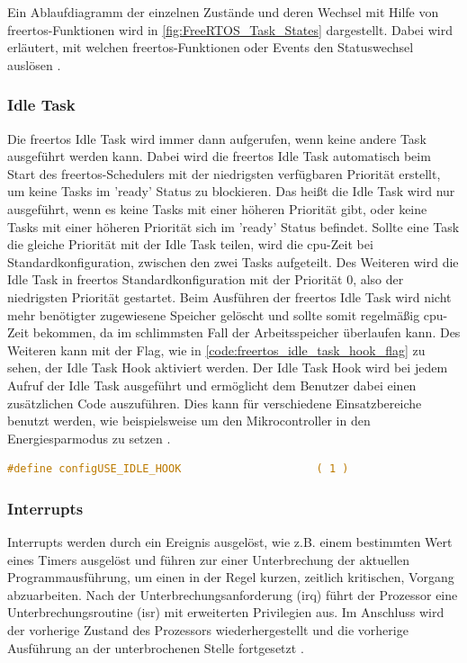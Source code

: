 \documentclass[../EDF Master Thesis.tex]{subfiles}
\begin{document}
Ein Ablaufdiagramm der einzelnen Zustände und deren Wechsel mit Hilfe von \ac{freertos}-Funktionen wird in \autoref{fig:FreeRTOS_Task_States} dargestellt.
Dabei wird erläutert, mit welchen \ac{freertos}-Funktionen oder Events den Statuswechsel auslösen \autocite{freertos-task-states}.

\subsubsection{Idle Task} \label{section:idle_task}
Die \ac{freertos} Idle Task wird immer dann aufgerufen, wenn keine andere Task ausgeführt werden kann.
Dabei wird die \ac{freertos} Idle Task automatisch beim Start des \ac{freertos}-Schedulers mit der niedrigsten verfügbaren Priorität erstellt, um keine Tasks im 'ready' Status zu blockieren.
Das heißt die Idle Task wird nur ausgeführt, wenn es keine Tasks mit einer höheren Priorität gibt, oder keine Tasks mit einer höheren Priorität sich im 'ready' Status befindet.
Sollte eine Task die gleiche Priorität mit der Idle Task teilen, wird die \ac{cpu}-Zeit bei Standardkonfiguration, zwischen den zwei Tasks aufgeteilt.
Des Weiteren wird die Idle Task in \ac{freertos} Standardkonfiguration mit der Priorität 0, also der niedrigsten Priorität gestartet.
Beim Ausführen der \ac{freertos} Idle Task wird nicht mehr benötigter zugewiesene Speicher gelöscht und sollte somit regelmäßig \ac{cpu}-Zeit bekommen, da im schlimmsten Fall der Arbeitsspeicher überlaufen kann.
Des Weiteren kann mit der Flag, wie in \autoref{code:freertos_idle_task_hook_flag} zu sehen, der Idle Task Hook aktiviert werden.
Der Idle Task Hook wird bei jedem Aufruf der Idle Task ausgeführt und ermöglicht dem Benutzer dabei einen zusätzlichen Code auszuführen.
Dies kann für verschiedene Einsatzbereiche benutzt werden, wie beispielsweise um den Mikrocontroller in den Energiesparmodus zu setzen \autocite{freertos_idle_task}.

\begin{lstlisting}[language=C, caption=FreeRTOS Idle Task Hook Flag, label=code:freertos_idle_task_hook_flag]
    #define configUSE_IDLE_HOOK                     ( 1 )
\end{lstlisting}


\subsubsection{Interrupts} \label{section:interrupts}
Interrupts werden durch ein Ereignis ausgelöst, wie z.B. einem bestimmten Wert eines Timers ausgelöst und führen zur einer Unterbrechung der aktuellen Programmausführung, um einen in der Regel kurzen, zeitlich kritischen, Vorgang abzuarbeiten.
Nach der Unterbrechungsanforderung (\ac{irq}) führt der Prozessor eine Unterbrechungsroutine (\ac{isr}) mit erweiterten Privilegien aus.
Im Anschluss wird der vorherige Zustand des Prozessors wiederhergestellt und die vorherige Ausführung an der unterbrochenen Stelle fortgesetzt \parencite{grundkurs_betriebssysteme, wiki:008}.
\end{document}
